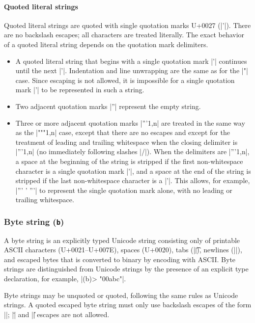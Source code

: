 \documentclass[11pt]{article}
\begin{document}
\paragraph{Quoted literal strings}

Quoted literal strings are quoted with single quotation marks U+0027 (|'|).  There are no backslash escapes; all characters are treated literally.  The exact behavior of a quoted literal string depends on the quotation mark delimiters.
\begin{itemize}
\item A quoted literal string that begins with a single quotation mark |'| continues until the next |'|.  Indentation and line unwrapping are the same as for the |"| case.  Since escaping is not allowed, it is impossible for a single quotation mark |'| to be represented in such a string.
\item Two adjacent quotation marks |''| represent the empty string.
\item Three or more adjacent quotation marks |'''{1,n}| are treated in the same way as the |"""{1,n}| case, except that there are no escapes and except for the treatment of leading and trailing whitespace when the closing delimiter is |'''{1,n}| (no immediately following slashes |/|).  When the delimiters are |'''{1,n}|, a space at the beginning of the string is stripped if the first non-whitespace character is a single quotation mark |'|, and a space at the end of the string is stripped if the last non-whitespace character is a |'|.  This allows, for example, |''' ' '''| to represent the single quotation mark alone, with no leading or trailing whitespace.
\end{itemize}


\subsubsection{Byte string (\texttt{b})}

A byte string is an explicitly typed Unicode string consisting only of printable ASCII characters (U+0021--U+007E), spaces (U+0020), tabs (|\t|), newlines (|\n|), and escaped bytes that is converted to binary by encoding with ASCII.  Byte strings are distinguished from Unicode strings by the presence of an explicit type declaration, for example, |(b)> "\x00abc"|.

Byte strings may be unquoted or quoted, following the same rules as Unicode strings.  A quoted escaped byte string must only use backslash escapes of the form |\xHH|; |\u| and |\U| escapes are not allowed.
\end{document}
